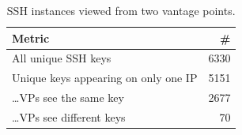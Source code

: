 \begin{table}[tb]
\centering
\caption{SSH instances viewed from two vantage points.}
\begin{tabular}{lr}
\toprule
\textbf{Metric} & \textbf{\#} \\
\midrule
All unique SSH keys & \num{6330} \\
Unique keys appearing on only one IP & \num{5151} \\
\ldots VPs see the same key & \num{2677} \\
\ldots VPs see different keys & \num{70} \\
\bottomrule
\end{tabular}
\label{tab:ssh_nrs}
\end{table}
